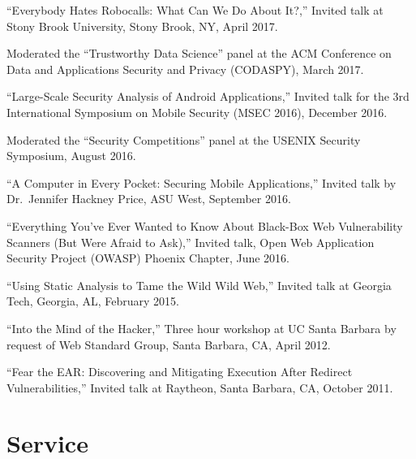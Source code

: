 \documentclass[11pt,letterpaper,sans]{moderncv}
\begin{document}
\begin{etaremune}
  \item ``Everybody Hates Robocalls: What Can We Do About It?,''
    Invited talk at Stony Brook University, Stony Brook, NY, April
    2017.

  \item Moderated the ``Trustworthy Data Science'' panel at the ACM
    Conference on Data and Applications Security and Privacy
    (CODASPY), March 2017.

  \item ``Large-Scale Security Analysis of Android Applications,''
    Invited talk for the 3rd International Symposium on Mobile
    Security (MSEC 2016), December 2016.

  \item Moderated the ``Security Competitions'' panel at the USENIX
    Security Symposium, August 2016.

  \item ``A Computer in Every Pocket: Securing Mobile Applications,''
    Invited talk by Dr.\ Jennifer Hackney Price, ASU West, September
    2016.

  \item ``Everything You've Ever Wanted to Know About Black-Box Web
    Vulnerability Scanners (But Were Afraid to Ask),'' Invited talk,
    Open Web Application Security Project (OWASP) Phoenix Chapter,
    June 2016.

  \item ``Using Static Analysis to Tame the Wild Wild Web,'' Invited
    talk at Georgia Tech, Georgia, AL, February 2015.

  \item ``Into the Mind of the Hacker,'' Three hour workshop at UC
    Santa Barbara by request of Web Standard Group, Santa Barbara, CA,
    April 2012.

  \item ``Fear the EAR: Discovering and Mitigating Execution After
    Redirect Vulnerabilities,'' Invited talk at Raytheon, Santa
    Barbara, CA, October 2011.

\end{etaremune}

\section{Service}
\end{document}
